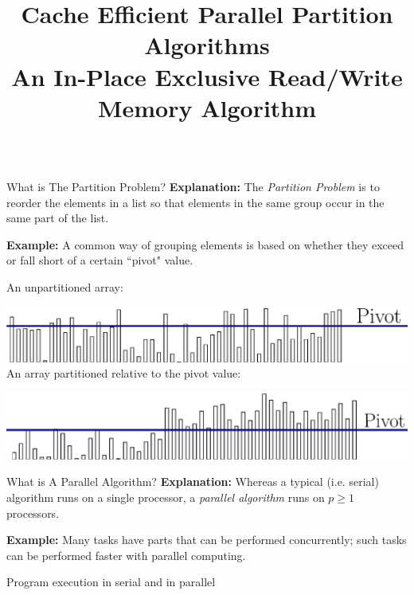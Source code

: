 \documentclass[table,serif,mathserif,final]{beamer}
\title{Cache Efficient Parallel Partition Algorithms \\An In-Place Exclusive Read/Write Memory Algorithm}
\theoremstyle{remark}
\begin{document}
\begin{frame}{}
\begin{columns}[t]
  \begin{column}{0.5\linewidth}
      
\begin{block}{\Huge What is The Partition Problem?}
  \justifying
  \Huge
  \textbf{Explanation:} The \emph{Partition Problem} is to reorder the elements in a list so that elements in the same group occur in the same part of the list.

  \textbf{Example:} A common way of grouping elements is based on whether they exceed or fall short of a certain ``pivot" value.

  {\color{blue} An unpartitioned array:}

  \includegraphics[width=\linewidth]{imgs/partitionDefn/partitionDefn1Ann.eps}
  {\color{blue} An array partitioned relative to the pivot value:}

  \includegraphics[width=\linewidth]{imgs/partitionDefn/partitionDefn2Ann.eps}
\end{block}
\begin{block}{\Huge What is A Parallel Algorithm?}
  \justifying
  \Huge
  \textbf{Explanation:} Whereas a typical (i.e. serial) algorithm runs on a single processor, a \emph{parallel algorithm} runs on $p \geq 1$ processors.

  \textbf{Example:} Many tasks have parts that can be performed concurrently; such tasks can be performed faster with parallel computing.

  {\color{blue} Program execution in serial and in parallel }


\end{block}
\end{column}
\end{columns}
\end{frame}
\end{document}
